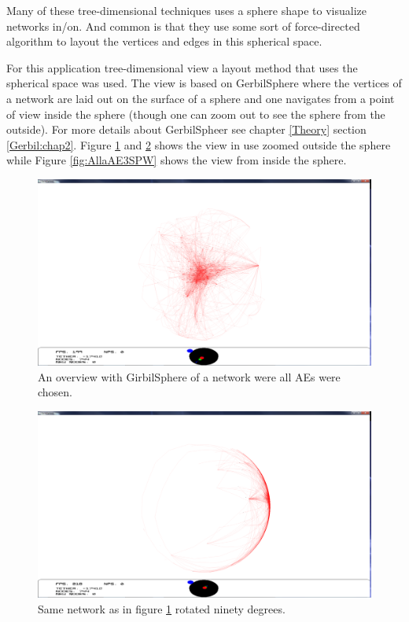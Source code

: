 \documentclass[a4paper,11pt]{kth-mag}
\begin{document}
Many of these tree-dimensional techniques uses a sphere shape to visualize networks in/on. And common is that they use some sort of force-directed algorithm to layout the vertices and edges in this spherical space.

For this application tree-dimensional view a layout method that uses the spherical space was used. The view is based on GerbilSphere \cite{Shelley20121016} where the vertices of a network are laid out on the surface of a 
sphere and one navigates from a point of view inside the sphere (though one can zoom out to see the sphere from the outside). For more details about GerbilSpheer see chapter \ref{Theory} section \ref{Gerbil:chap2}. 
Figure \ref{fig:AllaAE1SPW} and \ref{fig:AllaAE2SPW} shows the view in use zoomed outside the sphere while Figure \ref{fig:AllaAE3SPW} shows the view from inside the sphere.

\begin{figure}[!htbp]
	\centering
	\includegraphics[scale=0.3]{SesammVisualAppPics/SphericalView/AE/AE1}
	\caption{An overview with GirbilSphere of a network were all AEs were chosen.}
	\label{fig:AllaAE1SPW}
\end{figure}

\begin{figure}[!htbp]
	\centering
	\includegraphics[scale=0.3]{SesammVisualAppPics/SphericalView/AE/AE2}
	\caption{Same network as in figure \ref{fig:AllaAE1SPW} rotated ninety degrees.}
	\label{fig:AllaAE2SPW}
\end{figure}
\end{document}
